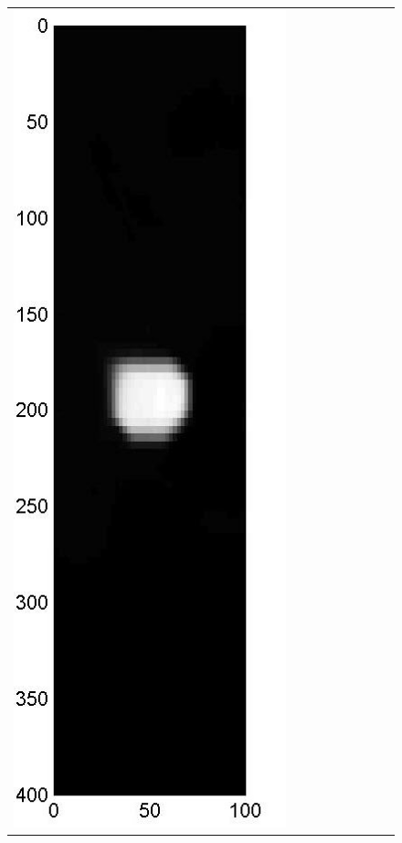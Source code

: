 \documentclass[11pt]{article}
\begin{document}
{\begin{figure}[!h]
\begin{center}
\begin{tabular}{|c|c|c|c|c|c|c|c|c|}
			\includegraphics[width=.9\iwidth]{figures/newFigs/noisy/resultsExp-4-mkTV}
			&

\end{tabular}
\end{center}
\end{figure}}
\end{document}
